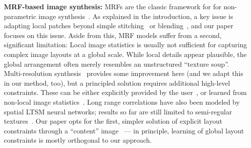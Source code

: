 \documentclass[10pt,twocolumn,letterpaper]{article}
\begin{document}
\textbf{MRF-based image synthesis:}
MRFs are the classic framework for for non-parametric image synthesis~\cite{Efros99}.
As explained in the introduction, a key issue is adapting local patches beyond simple stitching~\cite{Kwatra03} or blending~\cite{Kwatra05}, and our paper focuses on this issue. Aside from this, MRF models suffer from a second, significant limitation: Local image statistics is usually not sufficient for capturing complex image layouts at a global scale. While local details appear plausible, the global arrangement often merely resembles an unstructured ``texture soup''. Multi-resolution synthesis~\cite{Hertzmann01,Kwatra05,Wei00} provides some improvement here (and we adapt this in our method, too), but a principled solution requires additional high-level constraints. These can be either explicitly provided by the user~\cite{Agarwala04,Barnes09,Efros01,Gatys15,Hertzmann01,Lee10,Xie07}, or learned from non-local image statistics~\cite{He12,Li15,Zhang13}. Long range correlations have also been modeled by spatial LTSM neural networks; results so far are still limited to semi-regular textures~\cite{Theis2015}.
 Our paper opts for the first, simpler solution of explicit layout constraints through a ``content'' image~\cite{Gatys15,Hertzmann01} --- in principle, learning of global layout constraints is mostly orthogonal to our approach.
\end{document}

